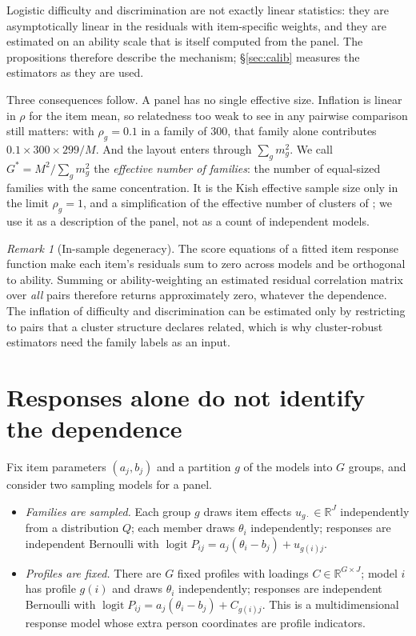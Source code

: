 \documentclass[10pt]{article}
\theoremstyle{remark}\newtheorem{remark}{Remark}
\begin{document}
Logistic difficulty and discrimination are not exactly linear statistics: they
are asymptotically linear in the residuals with item-specific weights, and
they are estimated on an ability scale that is itself computed from the panel.
The propositions therefore describe the mechanism; \S\ref{sec:calib} measures
the estimators as they are used.

Three consequences follow. A panel has no single effective size. Inflation is
linear in $\rho$ for the item mean, so relatedness too weak to see in any
pairwise comparison still matters: with $\rho_g=0.1$ in a family of 300, that
family alone contributes $0.1\times 300\times 299/M$. And the layout enters
through $\sum_g m_g^2$. We call $G^\ast=M^2/\sum_g m_g^2$ the
\emph{effective number of families}: the number of equal-sized families with
the same concentration. It is the Kish effective sample size only in the
limit $\rho_g=1$, and a simplification of the effective number of clusters of
\citet{carter2017asymptotic}; we use it as a description of the panel, not as
a count of independent models.

\begin{remark}[In-sample degeneracy]\label{rem:degenerate}
The score equations of a fitted item response function make each item's
residuals sum to zero across models and be orthogonal to ability. Summing or
ability-weighting an estimated residual correlation matrix over \emph{all}
pairs therefore returns approximately zero, whatever the dependence. The
inflation of difficulty and discrimination can be estimated only by
restricting to pairs that a cluster structure declares related, which is why
cluster-robust estimators need the family labels as an input.
\end{remark}

\section{Responses alone do not identify the dependence}\label{sec:ident}
Fix item parameters $(a_j,b_j)$ and a partition $g$ of the models into $G$
groups, and consider two sampling models for a panel.
\begin{itemize}\itemsep1pt
\item[\textbf{F}] \emph{Families are sampled.} Each group $g$ draws item
  effects $u_{g\cdot}\in\mathbb R^J$ independently from a distribution $Q$;
  each member draws $\theta_i$ independently; responses are independent
  Bernoulli with $\operatorname{logit}P_{ij}=a_j(\theta_i-b_j)+u_{g(i)j}$.
\item[\textbf{D}] \emph{Profiles are fixed.} There are $G$ fixed profiles with
  loadings $C\in\mathbb R^{G\times J}$; model $i$ has profile $g(i)$ and draws
  $\theta_i$ independently; responses are independent Bernoulli with
  $\operatorname{logit}P_{ij}=a_j(\theta_i-b_j)+C_{g(i)j}$. This is a
  multidimensional response model whose extra person coordinates are profile
  indicators.
\end{itemize}
\end{document}
